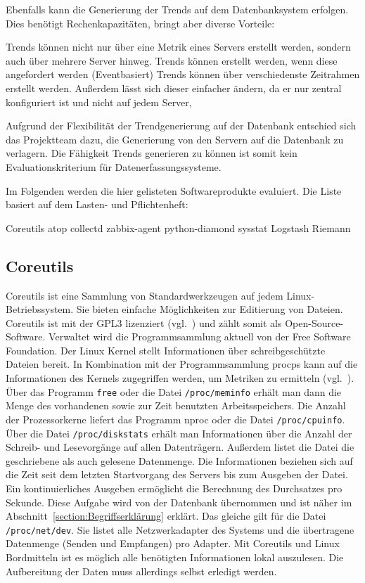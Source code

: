 {Ebenfalls kann die Generierung der Trends auf dem Datenbanksystem erfolgen.
Dies benötigt Rechenkapazitäten, bringt aber diverse Vorteile:

\begin{outline}
  \1 Trends können nicht nur über eine Metrik eines Servers erstellt werden,
  sondern auch über mehrere Server hinweg.
  \1 Trends können erstellt werden, wenn diese angefordert werden
  (Eventbasiert)
  \1 Trends können über verschiedenste Zeitrahmen erstellt werden. Außerdem
  lässt sich dieser einfacher ändern, da er nur zentral konfiguriert ist und
  nicht auf jedem Server,
\end{outline}

Aufgrund der Flexibilität der Trendgenerierung auf der Datenbank entschied sich
das Projektteam dazu, die Generierung von den Servern auf die Datenbank zu
verlagern. Die Fähigkeit Trends generieren zu können ist somit kein
Evaluationskriterium für Datenerfassungssysteme.

Im Folgenden werden die hier gelisteten Softwareprodukte evaluiert. Die Liste
basiert auf dem Lasten- und Pflichtenheft:

\begin{outline}
  \1 Coreutils
  \1 atop
  \1 collectd
  \1 zabbix\hyp{}agent
  \1 python\hyp{}diamond
  \1 sysstat
  \1 Logstash
  \1 Riemann
\end{outline}
\tm%

\subsection{Coreutils}
Coreutils ist eine Sammlung von Standardwerkzeugen auf jedem
Linux\hyp{}Betriebssystem. Sie bieten einfache Möglichkeiten zur Editierung von
Dateien. Coreutils ist mit der GPL3 lizenziert (vgl.~\cite{coreutils}) und
zählt somit als Open\hyp{}Source\hyp{}Software. Verwaltet wird die
Programmsammlung aktuell von der Free Software Foundation. Der Linux Kernel
stellt Informationen über schreibgeschützte Dateien bereit. In Kombination mit
der Programmsammlung procps kann auf die Informationen des Kernels zugegriffen
werden, um Metriken zu ermitteln (vgl.~\cite{procps}). Über das Programm
\texttt{free} oder die Datei \texttt{/proc/meminfo} erhält man dann die Menge
des vorhandenen sowie zur Zeit benutzten Arbeitsspeichers. Die Anzahl der
Prozessorkerne liefert das Programm nproc oder die Datei
\texttt{/proc/cpuinfo}. Über die Datei \texttt{/proc/diskstats} erhält man
Informationen über die Anzahl der Schreib- und Lesevorgänge auf allen
Datenträgern. Außerdem listet die Datei die geschriebene als auch gelesene
Datenmenge. Die Informationen beziehen sich auf die Zeit seit dem letzten
Startvorgang des Servers bis zum Ausgeben der Datei. Ein kontinuierliches
Ausgeben ermöglicht die Berechnung des Durchsatzes pro Sekunde. Diese Aufgabe
wird von der Datenbank übernommen und ist näher im
Abschnitt~\ref{section:Begriffserklärung} erklärt. Das gleiche gilt für die
Datei \texttt{/proc/net/dev}. Sie listet alle Netzwerkadapter des Systems und
die übertragene Datenmenge (Senden und Empfangen) pro Adapter. Mit Coreutils
und Linux Bordmitteln ist es möglich alle benötigten Informationen lokal
auszulesen. Die Aufbereitung der Daten muss allerdings selbst erledigt werden.

}
